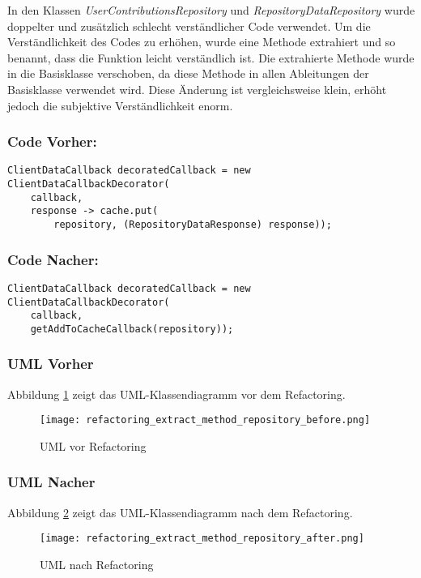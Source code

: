 In den Klassen \textit{UserContributionsRepository} und \textit{RepositoryDataRepository} wurde doppelter und zusätzlich schlecht verständlicher Code verwendet.
Um die Verständlichkeit des Codes zu erhöhen, wurde eine Methode extrahiert und so benannt, dass die Funktion leicht verständlich ist.
Die extrahierte Methode wurde in die Basisklasse verschoben, da diese Methode in allen Ableitungen der Basisklasse verwendet wird.
Diese Änderung ist vergleichsweise klein, erhöht jedoch die subjektive Verständlichkeit enorm.
\subsubsection*{Code Vorher:}
\begin{lstlisting}[breaklines=false]
ClientDataCallback decoratedCallback = new ClientDataCallbackDecorator(
	callback, 
	response -> cache.put(
		repository, (RepositoryDataResponse) response));
\end{lstlisting}
\subsubsection*{Code Nacher:}
\begin{lstlisting}[breaklines=false]
ClientDataCallback decoratedCallback = new ClientDataCallbackDecorator(
	callback, 
	getAddToCacheCallback(repository));
\end{lstlisting}

\newpage
\subsubsection{UML Vorher}
Abbildung \ref{fig:ExtractMethod_Refactoring_Before} zeigt das UML-Klassendiagramm vor dem Refactoring.
\begin{figure}[h]
  \texttt{[image: refactoring\_extract\_method\_repository\_before.png]}
  \centering
  \caption{UML vor Refactoring}
  \label{fig:ExtractMethod_Refactoring_Before}
\end{figure}

\newpage
\subsubsection{UML Nacher}
Abbildung \ref{fig:ExtractMethod_Refactoring_After} zeigt das UML-Klassendiagramm nach dem Refactoring.
\begin{figure}[h]
  \texttt{[image: refactoring\_extract\_method\_repository\_after.png]}
  \caption{UML nach Refactoring}
  \label{fig:ExtractMethod_Refactoring_After}
\end{figure}
\newpage


